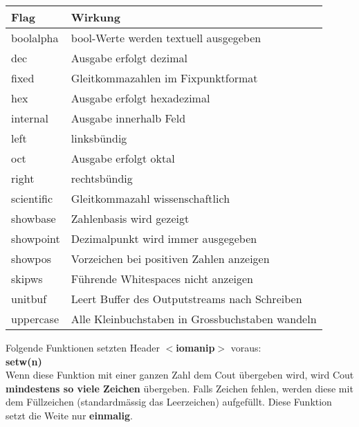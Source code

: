 \begin{center}
    \begin{tabular}{ll}
        \rowcolor[RGB]{239,239,239} 
        \textbf{Flag} & \textbf{Wirkung}                                        \\ \hline
        boolalpha     & bool-Werte werden textuell ausgegeben                   \\
        dec           & Ausgabe erfolgt dezimal                                 \\
        fixed         & Gleitkommazahlen im Fixpunktformat                      \\
        hex           & Ausgabe erfolgt hexadezimal                             \\
        internal      & Ausgabe innerhalb Feld                                  \\
        left          & linksbündig                                             \\
        oct           & Ausgabe erfolgt oktal                                   \\
        right         & rechtsbündig                                            \\
        scientific    & Gleitkommazahl wissenschaftlich                         \\
        showbase      & Zahlenbasis wird gezeigt                                \\
        showpoint     & Dezimalpunkt wird immer ausgegeben                      \\
        showpos       & Vorzeichen bei positiven Zahlen anzeigen                \\
        skipws        & Führende Whitespaces nicht anzeigen                     \\
        unitbuf       & Leert Buffer des Outputstreams nach Schreiben           \\
        uppercase     & Alle Kleinbuchstaben in Grossbuchstaben wandeln
    \end{tabular}
\end{center}

Folgende Funktionen setzten Header \textbf{$<$iomanip$>$} voraus:\\

\textbf{setw(n)}\\

Wenn diese Funktion mit einer ganzen Zahl dem Cout übergeben wird, wird Cout \textbf{mindestens so viele Zeichen} übergeben. 
Falls Zeichen fehlen, werden diese mit dem Füllzeichen (standardmässig das Leerzeichen) aufgefüllt. 
Diese Funktion setzt die Weite nur \textbf{einmalig}.\\

